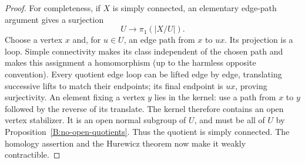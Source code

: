 \begin{proof}
For completeness, if $X$ is simply connected, an elementary
edge-path argument gives a surjection
\[
 U\longrightarrow\pi_1(|X/U|).
\]
Choose a vertex $x$ and, for $u\in U$, an edge path from $x$ to
$ux$. Its projection is a loop. Simple connectivity makes its
class independent of the chosen path and makes this assignment
a homomorphism (up to the harmless opposite convention).
Every quotient edge loop can be lifted edge by edge, translating
successive lifts to match their endpoints; its final endpoint is
$ux$, proving surjectivity. An element fixing a vertex $y$ lies
in the kernel: use a path from $x$ to $y$ followed by the reverse
of its translate. The kernel therefore contains an open vertex
stabilizer. It is an open normal subgroup of $U$, and must be
all of $U$ by Proposition~\ref{B:no-open-quotients}. Thus the
quotient is simply connected. The homology assertion and the
Hurewicz theorem now make it weakly contractible.
\end{proof}

